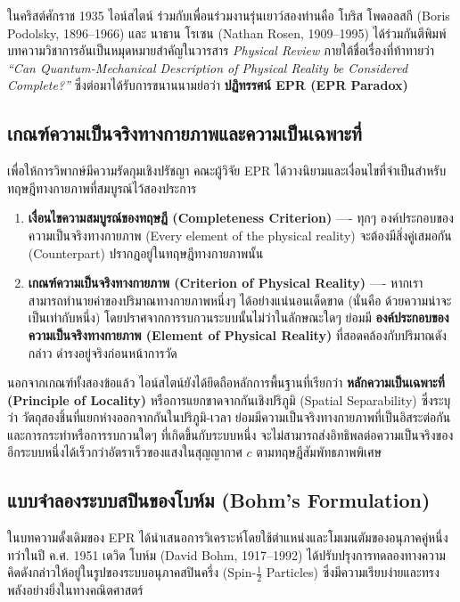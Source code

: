 ในคริสต์ศักราช 1935 ไอน์สไตน์ ร่วมกับเพื่อนร่วมงานรุ่นเยาว์สองท่านคือ โบริส โพดอลสกี (Boris Podolsky, 1896--1966) และ นาธาน โรเซน (Nathan Rosen, 1909--1995) ได้ร่วมกันตีพิมพ์บทความวิชาการอันเป็นหมุดหมายสำคัญในวารสาร \textit{Physical Review} ภายใต้ชื่อเรื่องที่ท้าทายว่า \textit{“Can Quantum-Mechanical Description of Physical Reality be Considered Complete?”} ซึ่งต่อมาได้รับการขนานนามย่อว่า \textbf{ปฏิทรรศน์ EPR (EPR Paradox)}

\subsection{เกณฑ์ความเป็นจริงทางกายภาพและความเป็นเฉพาะที่}
เพื่อให้การวิพากษ์มีความรัดกุมเชิงปรัชญา คณะผู้วิจัย EPR ได้วางนิยามและเงื่อนไขที่จำเป็นสำหรับทฤษฎีทางกายภาพที่สมบูรณ์ไว้สองประการ

\begin{enumerate}
    \item \textbf{เงื่อนไขความสมบูรณ์ของทฤษฎี (Completeness Criterion)} ---- ทุกๆ องค์ประกอบของความเป็นจริงทางกายภาพ (Every element of the physical reality) จะต้องมีสิ่งคู่เสมอกัน (Counterpart) ปรากฏอยู่ในทฤษฎีทางกายภาพนั้น
    \item \textbf{เกณฑ์ความเป็นจริงทางกายภาพ (Criterion of Physical Reality)} ---- หากเราสามารถทำนายค่าของปริมาณทางกายภาพหนึ่งๆ ได้อย่างแน่นอนเด็ดขาด (นั่นคือ ด้วยความน่าจะเป็นเท่ากับหนึ่ง) โดยปราศจากการรบกวนระบบนั้นไม่ว่าในลักษณะใดๆ ย่อมมี \textbf{องค์ประกอบของความเป็นจริงทางกายภาพ (Element of Physical Reality)} ที่สอดคล้องกับปริมาณดังกล่าว ดำรงอยู่จริงก่อนหน้าการวัด
\end{enumerate}

นอกจากเกณฑ์ทั้งสองข้อแล้ว ไอน์สไตน์ยังได้ยึดถือหลักการพื้นฐานที่เรียกว่า \textbf{หลักความเป็นเฉพาะที่ (Principle of Locality)} หรือการแยกขาดจากกันเชิงปริภูมิ (Spatial Separability) ซึ่งระบุว่า วัตถุสองชิ้นที่แยกห่างออกจากกันในปริภูมิ-เวลา ย่อมมีความเป็นจริงทางกายภาพที่เป็นอิสระต่อกัน และการกระทำหรือการรบกวนใดๆ ที่เกิดขึ้นกับระบบหนึ่ง จะไม่สามารถส่งอิทธิพลต่อความเป็นจริงของอีกระบบหนึ่งได้เร็วกว่าอัตราเร็วของแสงในสุญญากาศ $c$ ตามทฤษฎีสัมพัทธภาพพิเศษ

\subsection{แบบจำลองระบบสปินของโบห์ม (Bohm's Formulation)}
ในบทความดั้งเดิมของ EPR ได้นำเสนอการวิเคราะห์โดยใช้ตำแหน่งและโมเมนตัมของอนุภาคคู่หนึ่ง ทว่าในปี ค.ศ. 1951 เดวิด โบห์ม (David Bohm, 1917--1992) ได้ปรับปรุงการทดลองทางความคิดดังกล่าวให้อยู่ในรูปของระบบอนุภาคสปินครึ่ง (Spin-$\frac{1}{2}$ Particles) ซึ่งมีความเรียบง่ายและทรงพลังอย่างยิ่งในทางคณิตศาสตร์

